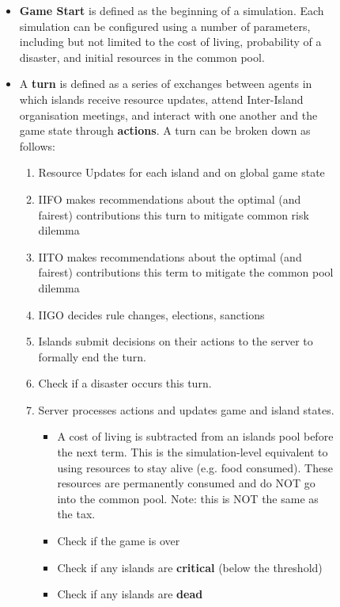 \begin{figure}[!htb]
    \begin{itemize}
        \item \textbf{Game Start} is defined as the beginning of a simulation. Each simulation can be configured using a number of parameters, including but not limited to the cost of living, probability of a disaster, and initial resources in the common pool.
        \item A \textbf{turn} is defined as a series of exchanges between agents in which islands receive resource updates, attend Inter-Island organisation meetings, and interact with one another and the game state through \textbf{actions}. A turn can be broken down as follows:
            \begin{enumerate}
                \item Resource Updates for each island and on global game state
                \item IIFO makes recommendations about the optimal (and fairest) contributions this turn to mitigate common risk dilemma 
                \item IITO makes recommendations about the optimal (and fairest) contributions this term to mitigate the common pool dilemma
                \item IIGO decides rule changes, elections, sanctions
                \item Islands submit decisions on their actions to the server to formally end the turn.
                \item Check if a disaster occurs this turn.
                \item Server processes actions and updates game and island states.
                    \begin{itemize}
                        \item A cost of living is subtracted from an islands pool before the next term. This is the simulation-level equivalent to using resources to stay alive (e.g. food consumed). These resources are permanently consumed and do NOT go into the common pool. Note: this is NOT the same as the tax. 
                        \item Check if the game is over
                        \item Check if any islands are \textbf{critical} (below the threshold)
                        \item Check if any islands are \textbf{dead}

\end{itemize}
\end{enumerate}
\end{itemize}
\end{figure}
